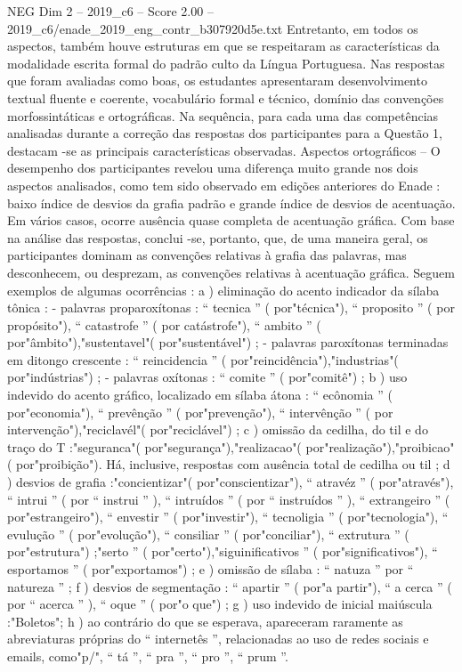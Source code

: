 \begin{textsample}{NEG Dim 2 – 2019\_c6 – Score 2.00 – 2019\_c6/enade\_2019\_eng\_contr\_b307920d5e.txt}
Entretanto, em todos os aspectos, também houve estruturas em que se respeitaram as características da modalidade escrita formal do padrão culto da Língua Portuguesa.
Nas respostas que foram avaliadas como boas, os estudantes apresentaram desenvolvimento textual fluente e coerente, vocabulário formal e técnico, domínio das convenções morfossintáticas e ortográficas.
Na sequência, para cada uma das competências analisadas durante a correção das respostas dos participantes para a Questão 1, destacam -se as principais características observadas.
Aspectos ortográficos – O desempenho dos participantes revelou uma diferença muito grande nos dois aspectos analisados, como tem sido observado em edições anteriores do Enade : baixo índice de desvios da grafia padrão e grande índice de desvios de acentuação.
Em vários casos, ocorre ausência quase completa de acentuação gráfica.
Com base na análise das respostas, conclui -se, portanto, que, de uma maneira geral, os participantes dominam as convenções relativas à grafia das palavras, mas desconhecem, ou desprezam, as convenções relativas à acentuação gráfica.
Seguem exemplos de algumas ocorrências : a ) eliminação do acento indicador da sílaba tônica : - palavras proparoxítonas : “ tecnica ” ( por"técnica"), “ proposito ” ( por propósito"), “ catastrofe ” ( por catástrofe"), “ ambito ” ( por"âmbito"),"sustentavel"( por"sustentável") ; - palavras paroxítonas terminadas em ditongo crescente : “ reincidencia ” ( por"reincidência"),"industrias"( por"indústrias") ; - palavras oxítonas : “ comite ” ( por"comitê") ; b ) uso indevido do acento gráfico, localizado em sílaba átona : “ ecônomia ” ( por"economia"), “ prevênção ” ( por"prevenção"), “ intervênção ” ( por intervenção"),"reciclavél"( por"reciclável") ; c ) omissão da cedilha, do til e do traço do T :"seguranca"( por"segurança"),"realizacao"( por"realização"),"proibicao"( por"proibição").
Há, inclusive, respostas com ausência total de cedilha ou til ; d ) desvios de grafia :"concientizar"( por"conscientizar"), “ atravéz ” ( por"através"), “ intrui ” ( por “ instrui ” ), “ intruídos ” ( por “ instruídos ” ), “ extrangeiro ” ( por"estrangeiro"), “ envestir ” ( por"investir"), “ tecnoligia ” ( por"tecnologia"), “ evulução ” ( por"evolução"), “ consiliar ” ( por"conciliar"), “ extrutura ” ( por"estrutura") ;"serto ” ( por"certo"),"siguinificativos ” ( por"significativos"), “ esportamos ” ( por"exportamos") ; e ) omissão de sílaba : “ natuza ” por “ natureza ” ; f ) desvios de segmentação : “ apartir ” ( por"a partir"), “ a cerca ” ( por “ acerca ” ), “ oque ” ( por"o que") ; g ) uso indevido de inicial maiúscula :"Boletos"; h ) ao contrário do que se esperava, apareceram raramente as abreviaturas próprias do “ internetês ”, relacionadas ao uso de redes sociais e emails, como"p/", “ tá ”, “ pra ”, “ pro ”, “ prum ”.

\end{textsample}

